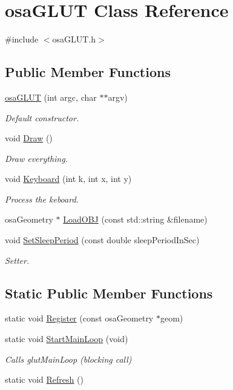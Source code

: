 \hypertarget{classosa_g_l_u_t}{\section{osa\-G\-L\-U\-T Class Reference}
\label{classosa_g_l_u_t}
}


{\ttfamily \#include $<$osa\-G\-L\-U\-T.\-h$>$}

\subsection*{Public Member Functions}
\begin{DoxyCompactItemize}
\item 
\hyperlink{classosa_g_l_u_t_abb77fc0b522755ae9387287b76e99202}{osa\-G\-L\-U\-T} (int argc, char $\ast$$\ast$argv)
\begin{DoxyCompactList}\small\item\em Default constructor. \end{DoxyCompactList}\item 
void \hyperlink{classosa_g_l_u_t_a8d335ab5dd26f88cd639741892638c6b}{Draw} ()
\begin{DoxyCompactList}\small\item\em Draw everything. \end{DoxyCompactList}\item 
void \hyperlink{classosa_g_l_u_t_a5dcd0f91e6d6d18f23e2e8add4e29c1d}{Keyboard} (int k, int x, int y)
\begin{DoxyCompactList}\small\item\em Process the keboard. \end{DoxyCompactList}\item 
osa\-Geometry $\ast$ \hyperlink{classosa_g_l_u_t_ac943ced6cc1f1e6247e67f8fe7f2a8c9}{Load\-O\-B\-J} (const std\-::string \&filename)
\item 
void \hyperlink{classosa_g_l_u_t_a3a0f234d9df4fad63ee8cc552cf91c3c}{Set\-Sleep\-Period} (const double sleep\-Period\-In\-Sec)
\begin{DoxyCompactList}\small\item\em Setter. \end{DoxyCompactList}\end{DoxyCompactItemize}
\subsection*{Static Public Member Functions}
\begin{DoxyCompactItemize}
\item 
static void \hyperlink{classosa_g_l_u_t_aa77448582c922b2ed33f960812187037}{Register} (const osa\-Geometry $\ast$geom)
\item 
static void \hyperlink{classosa_g_l_u_t_a021f0ee0cfe927100384941391cb75f5}{Start\-Main\-Loop} (void)
\begin{DoxyCompactList}\small\item\em Calls glut\-Main\-Loop (blocking call) \end{DoxyCompactList}\item 
static void \hyperlink{classosa_g_l_u_t_ad6e24fe4a48bcd2e9fe2e2532f0ef577}{Refresh} ()
\end{DoxyCompactItemize}

